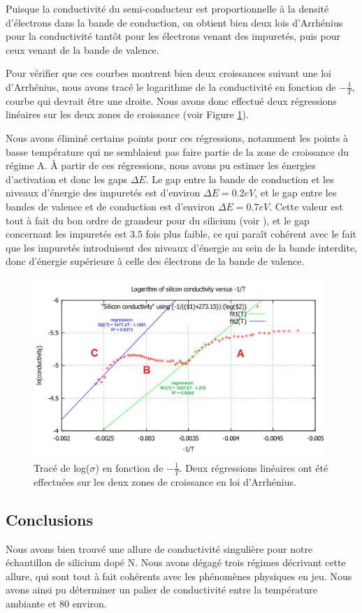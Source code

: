 Puisque la conductivité du semi-conducteur est proportionnelle à la densité d'électrons dans la bande de conduction, on obtient bien deux lois d'Arrhénius pour la conductivité tantôt pour les électrons venant des impuretés, puis pour ceux venant de la bande de valence.

Pour vérifier que ces courbes montrent bien deux croissances suivant une loi d'Arrhénius, nous avons tracé le logarithme de la conductivité en fonction de $-\frac{1}{T}$, courbe qui devrait être une droite. Nous avons donc effectué deux régressions linéaires sur les deux zones de croissance (voir Figure \ref{log}).

Nous avons éliminé certains points pour ces régressions, notamment les points à basse température qui ne semblaient 
pas faire partie de la zone de croissance du régime A. À partir de ces régressions, nous avons pu estimer les énergies 
d'activation et donc les gaps $\Delta E$. Le gap entre la bande de conduction et les niveaux d'énergie des impuretés 
est d'environ $\Delta E = 0.2 eV$, et le gap entre les bandes de valence et de conduction est d'environ $\Delta E = 0.7 eV$. 
Cette valeur est tout à fait du bon ordre de grandeur pour du silicium (voir \cite{kittel_introduction_1976}), et le 
gap concernant les impuretés est $3.5$ fois plus faible, ce qui paraît cohérent avec le fait que les impuretés introduisent 
des niveaux d'énergie au sein de la bande interdite, donc d'énergie supérieure à celle des électrons de la bande de valence.

\begin{figure}[ht]
  \begin{center}
		\includegraphics[width=11cm]{./images/Fit_de_log(sigma)_versus_-inverse(T).png}
		\caption{Tracé de log($\sigma$) en fonction de $-\frac{1}{T}$. Deux régressions linéaires ont été effectuées sur les deux zones de croissance en loi d'Arrhénius.}
		\label{log}
	\end{center}
\end{figure}

\subsection{Conclusions}
Nous avons bien trouvé une allure de conductivité singulière pour notre échantillon de silicium dopé N. Nous avons 
dégagé trois régimes décrivant cette allure, qui sont tout à fait cohérents avec les phénomènes physiques en jeu. 
Nous avons ainsi pu déterminer un palier de conductivité entre la température ambiante et 80 \celsius{} environ.
